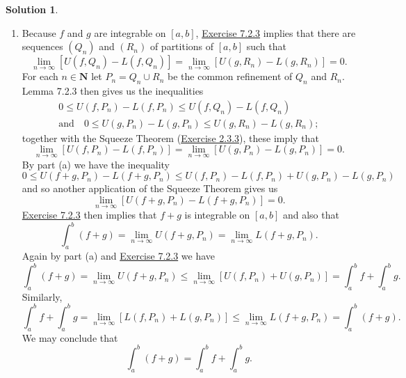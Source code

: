\documentclass[12pt]{article}
\theoremstyle{definition}
\theoremstyle{exercise}
\theoremstyle{solution}
\newtheorem*{solution}{Solution}
\newcommand{\N}{\mathbf{N}}
\begin{document}
\begin{solution}
\begin{enumerate}
        \item Because \( f \) and \( g \) are integrable on \( [a, b] \), \href{https://lew98.github.io/Mathematics/UA_Section_7_2_Exercises.pdf}{Exercise 7.2.3} implies that there are sequences \( (Q_n) \) and \( (R_n) \) of partitions of \( [a, b] \) such that
        \[
            \lim_{n \to \infty} [U(f, Q_n) - L(f, Q_n)] = \lim_{n \to \infty} [U(g, R_n) - L(g, R_n)] = 0.
        \]
        For each \( n \in \N \) let \( P_n = Q_n \cup R_n \) be the common refinement of \( Q_n \) and \( R_n \). Lemma 7.2.3 then gives us the inequalities
        \begin{multline*}
            0 \leq U(f, P_n) - L(f, P_n) \leq U(f, Q_n) - L(f, Q_n) \\[2mm]
            \text{and} \quad 0 \leq U(g, P_n) - L(g, P_n) \leq U(g, R_n) - L(g, R_n);
        \end{multline*}
        together with the Squeeze Theorem (\href{https://lew98.github.io/Mathematics/UA_Section_2_3_Exercises.pdf}{Exercise 2.3.3}), these imply that
        \[
            \lim_{n \to \infty} [U(f, P_n) - L(f, P_n)] = \lim_{n \to \infty} [U(g, P_n) - L(g, P_n)] = 0.
        \]
        By part (a) we have the inequality
        \[
            0 \leq U(f + g, P_n) - L(f + g, P_n) \leq U(f, P_n) - L(f, P_n) + U(g, P_n) - L(g, P_n)
        \]
        and so another application of the Squeeze Theorem gives us
        \[
            \lim_{n \to \infty} [U(f + g, P_n) - L(f + g, P_n)] = 0.
        \]
        \href{https://lew98.github.io/Mathematics/UA_Section_7_2_Exercises.pdf}{Exercise 7.2.3} then implies that \( f + g \) is integrable on \( [a, b] \) and also that
        \[
            \int_a^b (f + g) = \lim_{n \to \infty} U(f + g, P_n) = \lim_{n \to \infty} L(f + g, P_n).
        \]
        Again by part (a) and \href{https://lew98.github.io/Mathematics/UA_Section_7_2_Exercises.pdf}{Exercise 7.2.3} we have
        \[
            \int_a^b (f + g) = \lim_{n \to \infty} U(f + g, P_n) \leq \lim_{n \to \infty} [U(f, P_n) + U(g, P_n)] = \int_a^b f + \int_a^b g.
        \]
        Similarly,
        \[
            \int_a^b f + \int_a^b g = \lim_{n \to \infty} [L(f, P_n) + L(g, P_n)] \leq \lim_{n \to \infty} L(f + g, P_n) = \int_a^b (f + g).
        \]
        We may conclude that
        \[
            \int_a^b (f + g) = \int_a^b f + \int_a^b g.
        \]
    \end{enumerate}
\end{solution}
\end{document}

